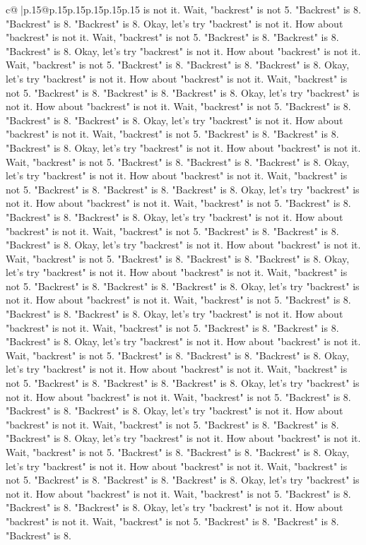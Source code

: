 \documentclass{article}
\begin{document}
{\begin{supertabular}{c@{$\;$}|p{.15\linewidth}@{}p{.15\linewidth}p{.15\linewidth}p{.15\linewidth}p{.15\linewidth}p{.15\linewidth}}
{{{is not it. Wait, "backrest" is not 5. "Backrest" is 8. "Backrest" is 8. "Backrest" is 8. Okay, let's try "backrest" is not it. How about "backrest" is not it. Wait, "backrest" is not 5. "Backrest" is 8. "Backrest" is 8. "Backrest" is 8. Okay, let's try "backrest" is not it. How about "backrest" is not it. Wait, "backrest" is not 5. "Backrest" is 8. "Backrest" is 8. "Backrest" is 8. Okay, let's try "backrest" is not it. How about "backrest" is not it. Wait, "backrest" is not 5. "Backrest" is 8. "Backrest" is 8. "Backrest" is 8. Okay, let's try "backrest" is not it. How about "backrest" is not it. Wait, "backrest" is not 5. "Backrest" is 8. "Backrest" is 8. "Backrest" is 8. Okay, let's try "backrest" is not it. How about "backrest" is not it. Wait, "backrest" is not 5. "Backrest" is 8. "Backrest" is 8. "Backrest" is 8. Okay, let's try "backrest" is not it. How about "backrest" is not it. Wait, "backrest" is not 5. "Backrest" is 8. "Backrest" is 8. "Backrest" is 8. Okay, let's try "backrest" is not it. How about "backrest" is not it. Wait, "backrest" is not 5. "Backrest" is 8. "Backrest" is 8. "Backrest" is 8. Okay, let's try "backrest" is not it. How about "backrest" is not it. Wait, "backrest" is not 5. "Backrest" is 8. "Backrest" is 8. "Backrest" is 8. Okay, let's try "backrest" is not it. How about "backrest" is not it. Wait, "backrest" is not 5. "Backrest" is 8. "Backrest" is 8. "Backrest" is 8. Okay, let's try "backrest" is not it. How about "backrest" is not it. Wait, "backrest" is not 5. "Backrest" is 8. "Backrest" is 8. "Backrest" is 8. Okay, let's try "backrest" is not it. How about "backrest" is not it. Wait, "backrest" is not 5. "Backrest" is 8. "Backrest" is 8. "Backrest" is 8. Okay, let's try "backrest" is not it. How about "backrest" is not it. Wait, "backrest" is not 5. "Backrest" is 8. "Backrest" is 8. "Backrest" is 8. Okay, let's try "backrest" is not it. How about "backrest" is not it. Wait, "backrest" is not 5. "Backrest" is 8. "Backrest" is 8. "Backrest" is 8. Okay, let's try "backrest" is not it. How about "backrest" is not it. Wait, "backrest" is not 5. "Backrest" is 8. "Backrest" is 8. "Backrest" is 8. Okay, let's try "backrest" is not it. How about "backrest" is not it. Wait, "backrest" is not 5. "Backrest" is 8. "Backrest" is 8. "Backrest" is 8. Okay, let's try "backrest" is not it. How about "backrest" is not it. Wait, "backrest" is not 5. "Backrest" is 8. "Backrest" is 8. "Backrest" is 8. Okay, let's try "backrest" is not it. How about "backrest" is not it. Wait, "backrest" is not 5. "Backrest" is 8. "Backrest" is 8. "Backrest" is 8. Okay, let's try "backrest" is not it. How about "backrest" is not it. Wait, "backrest" is not 5. "Backrest" is 8. "Backrest" is 8. "Backrest" is 8. Okay, let's try "backrest" is not it. How about "backrest" is not it. Wait, "backrest" is not 5. "Backrest" is 8. "Backrest" is 8. "Backrest" is 8. Okay, let's try "backrest" is not it. How about "backrest" is not it. Wait, "backrest" is not 5. "Backrest" is 8. "Backrest" is 8. "Backrest" is 8. Okay, let's try "backrest" is not it. How about "backrest" is not it. Wait, "backrest" is not 5. "Backrest" is 8. "Backrest" is 8. "Backrest" is 8. }}}
\end{supertabular}}
\end{document}

